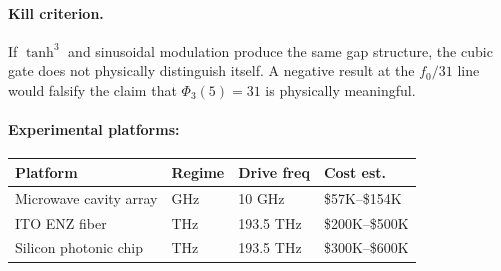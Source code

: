 \documentclass[12pt,a4paper]{article}
\theoremstyle{definition}
\newcommand{\Phithree}{\Phi_3}
\begin{document}
\paragraph{Kill criterion.}
If $\tanh^3$ and sinusoidal modulation produce the same gap structure,
the cubic gate does not physically distinguish itself. A negative result
at the $f_0/31$ line would falsify the claim that $\Phithree(5) = 31$ is
physically meaningful.

\paragraph{Experimental platforms:}
\begin{center}
\begin{tabular}{llll}
\toprule
Platform & Regime & Drive freq & Cost est. \\
\midrule
Microwave cavity array & GHz & 10 GHz & \$57K--\$154K \\
ITO ENZ fiber          & THz & 193.5 THz & \$200K--\$500K \\
Silicon photonic chip  & THz & 193.5 THz & \$300K--\$600K \\
\bottomrule
\end{tabular}
\end{center}
\end{document}
